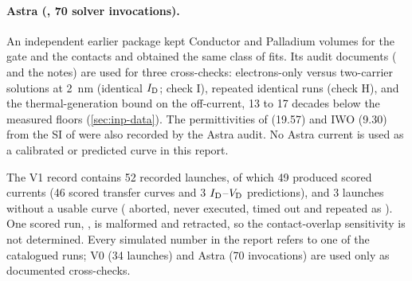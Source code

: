 \paragraph{Astra (, 70 solver invocations).} An independent earlier package
kept Conductor and Palladium volumes for the gate and the contacts and obtained the same class of fits. Its audit
documents ( and the  notes) are used for three
cross-checks: electrons-only versus two-carrier solutions at \SI{2}{nm} (identical $I_{\mathrm{D}}$; check I), repeated identical
runs (check H), and the thermal-generation bound on the off-current, 13 to 17 decades below the measured floors
(\cref{sec:inp-data}). The permittivities of \HfO{} (19.57) and IWO (9.30) from the SI of \citet{Januar2026} were also
recorded by the Astra audit. No Astra current is used as a calibrated or predicted curve in this report.

\begin{keyresult}
The V1 record contains 52 recorded launches, of which 49 produced scored currents (46 scored transfer curves and
3 $I_{\mathrm{D}}$--$V_{\mathrm{D}}$ predictions), and 3 launches without
a usable curve ( aborted,  never executed,  timed out and repeated as ). One
scored run, , is malformed and retracted, so the contact-overlap sensitivity is not determined. Every simulated
number in the report refers to one of the catalogued runs; V0 (34 launches) and Astra (70 invocations) are used only as
documented cross-checks.
\end{keyresult}
